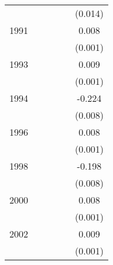 {\begin{tabular}{l*{5}{c}}
                    &                     &                     &                     &                     &     (0.014)         \\
[1em]
1991                &                     &                     &                     &                     &       0.008\sym{***}\\
                    &                     &                     &                     &                     &     (0.001)         \\
[1em]
1993                &                     &                     &                     &                     &       0.009\sym{***}\\
                    &                     &                     &                     &                     &     (0.001)         \\
[1em]
1994                &                     &                     &                     &                     &      -0.224\sym{***}\\
                    &                     &                     &                     &                     &     (0.008)         \\
[1em]
1996                &                     &                     &                     &                     &       0.008\sym{***}\\
                    &                     &                     &                     &                     &     (0.001)         \\
[1em]
1998                &                     &                     &                     &                     &      -0.198\sym{***}\\
                    &                     &                     &                     &                     &     (0.008)         \\
[1em]
2000                &                     &                     &                     &                     &       0.008\sym{***}\\
                    &                     &                     &                     &                     &     (0.001)         \\
[1em]
2002                &                     &                     &                     &                     &       0.009\sym{***}\\
                    &                     &                     &                     &                     &     (0.001)         \\

\end{tabular}}
